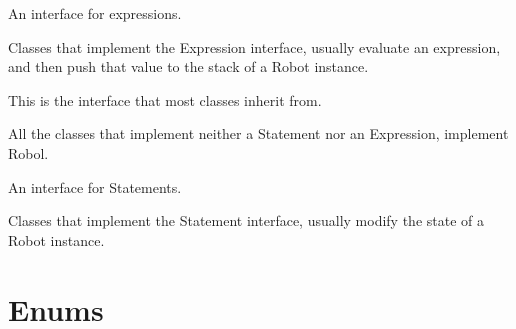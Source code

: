 \documentclass[letterpaper,10pt,english]{sphinxmanual}
\begin{document}
\begin{fulllineitems}
\label{\detokenize{interfaces:robol_lang.interfaces.Expression}}
\sphinxAtStartPar
An interface for expressions.

\sphinxAtStartPar
Classes that implement the Expression interface, usually evaluate an
expression, and then push that value to the stack of a Robot instance.

\end{fulllineitems}


\begin{fulllineitems}
\label{\detokenize{interfaces:robol_lang.interfaces.Robol}}
\sphinxAtStartPar
This is the interface that most classes inherit from.

\sphinxAtStartPar
All the classes that implement neither a Statement nor an Expression,
implement Robol.

\end{fulllineitems}


\begin{fulllineitems}
\label{\detokenize{interfaces:robol_lang.interfaces.Statement}}
\sphinxAtStartPar
An interface for Statements.

\sphinxAtStartPar
Classes that implement the Statement interface, usually modify the state
of a Robot instance.

\end{fulllineitems}



\chapter{Enums}
\label{\detokenize{enums:module-robol_lang.enums}}\label{\detokenize{enums:enums}}\label{\detokenize{enums::doc}}
\end{document}
